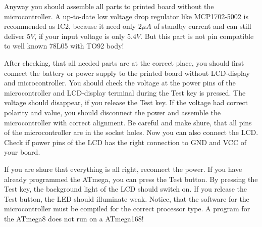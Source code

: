 Anyway you should assemble all parts to printed board without the microcontroller.
A up-to-date low voltage drop regulator like MCP1702-5002 is recommended as IC2, because it
need only \(2\mu A\) of standby current and can still deliver \(5V\), if your input
voltage is only \(5.4V\). But this part is not pin compatible to well known 78L05 with TO92 body!

After checking, that all needed parts are at the correct place, you should
first connect the battery or power supply to the printed board without LCD-display
and microcontroller. You should check the voltage at the power pins of the
microcontroller and LCD-display terminal during the Test key is pressed.
The voltage should disappear, if you release the Test key.
If the voltage had correct polarity and value,
you should disconnect the power and assemble the microcontroller with correct
alignment. Be careful and make shure, that all pins of the microcontroller
are in the socket holes.
Now you can also connect the LCD. Check if power pins of the LCD has the right connection to
GND and VCC of your board.

If you are shure that everything is all right, reconnect the power. 
If you have already programmed the ATmega, you can press the Test button.
By pressing the Test key, the background light of the LCD should switch on.
If you release the Test button, the LED should illuminate weak.
Notice, that the software for the microcontroller must be compiled for the
correct processor type. A program for the ATmega8 does not run on a ATmega168!

